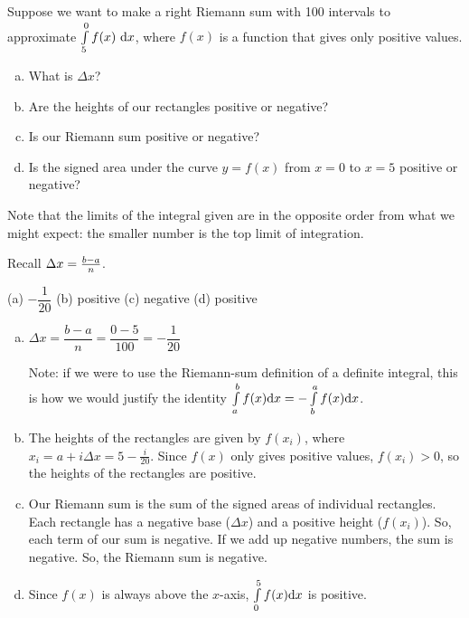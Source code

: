 \begin{question}
Suppose we want to make a right Riemann sum with 100 intervals to approximate $\int\limits_5^0 f(x)\ \dee{x}$, where $f(x)$ is a function that gives only positive values.\\[5pt]
\begin{enumerate}[(a)]
\item What is $\Delta x$?
\item Are the heights of our rectangles positive or negative?
\item Is our Riemann sum positive or negative?
\item Is the signed area under the curve $y=f(x)$ from $x=0$ to $x=5$ positive or negative?
\end{enumerate}
\end{question}
\begin{hint}
Note that the limits of the integral given are in the opposite order from what we might expect: the smaller number is the top limit of integration.

Recall $\Delta x = \frac{b-a}{n}$.
\end{hint}
\begin{answer}
(a) $-\dfrac{1}{20}$
\qquad
(b) positive
\qquad
(c) negative
\qquad
(d) positive

\end{answer}
\begin{solution}
\begin{enumerate}[(a)]
\item $\Delta x = \dfrac{b-a}{n}=\dfrac{0-5}{100} = -\dfrac{1}{20}$

Note: if we were to use the Riemann-sum definition of a definite integral, this is how we would justify the identity $\int\limits_a^b f(x)\mathrm{d}x=-\int\limits_b^a f(x)\mathrm{d}x$.

\item The heights of the rectangles are given by $f(x_i)$, where $x_i = a+i\Delta x = 5 - \frac{i}{20}$. Since $f(x)$ only gives positive values, $f(x_i) >0$, so the heights of the rectangles are positive.

\item Our Riemann sum is the sum of the signed areas of individual rectangles. Each rectangle has a negative base ($\Delta x$) and a positive height ($f(x_i)$).  So, each term of our sum is negative. If we add up negative numbers, the sum is negative. So, the Riemann sum is negative.
\item Since $f(x)$ is always above the $x$-axis, $\int\limits_0^5 f(x)\mathrm{d}x$ is positive.
\end{enumerate}

\end{solution}


